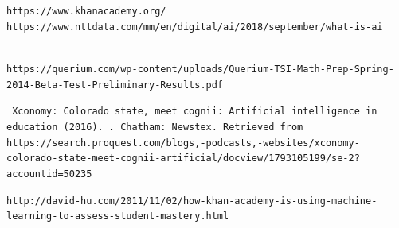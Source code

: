 \documentclass[10pt,oneside,slovak,a4paper]{article}
\begin{document}



	
\label{khanacademy} 
\texttt{https://www.khanacademy.org/}
\\
\label{AI} 
\texttt{https://www.nttdata.com/mm/en/digital/ai/2018/september/what-is-ai}
\date{22.11.2020}
\\
\label{querium_report}
\texttt{https://querium.com/wp-content/uploads/Querium-TSI-Math-Prep-Spring-2014-Beta-Test-Preliminary-Results.pdf}

\label{cognii}
\texttt{ Xconomy: Colorado state, meet cognii: Artificial intelligence in education (2016). . Chatham: Newstex. Retrieved from https://search.proquest.com/blogs,-podcasts,-websites/xconomy-colorado-state-meet-cognii-artificial/docview/1793105199/se-2?accountid=50235}


\label{khan_academy_learning}
\texttt{http://david-hu.com/2011/11/02/how-khan-academy-is-using-machine-learning-to-assess-student-mastery.html}
	
\end{document}
